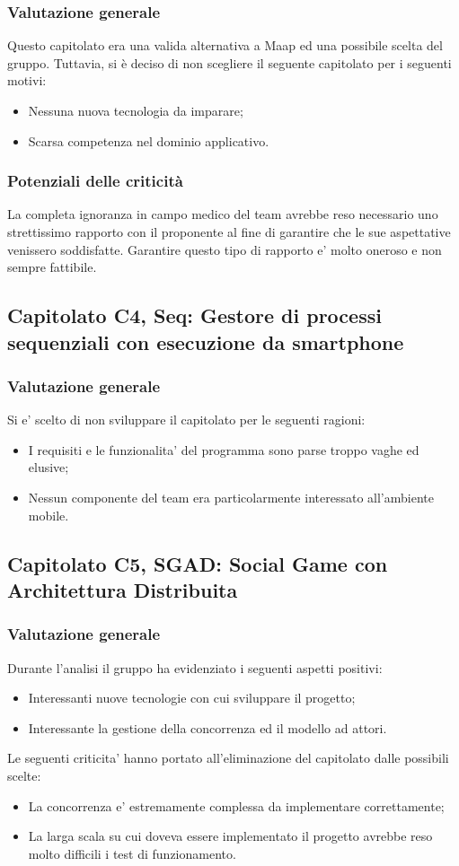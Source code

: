\subsubsection{Valutazione generale} 
Questo capitolato era una valida alternativa a Maap ed una possibile scelta del gruppo. Tuttavia, si è deciso di non scegliere il seguente capitolato per i seguenti motivi:
\begin{itemize}
\item Nessuna nuova tecnologia da imparare;
\item Scarsa competenza nel dominio applicativo.
\end{itemize}
\subsubsection{Potenziali delle criticità} 
La completa ignoranza in campo medico del team avrebbe reso necessario uno strettissimo rapporto con il proponente al fine di garantire che le sue aspettative venissero soddisfatte. Garantire questo tipo di rapporto e’ molto oneroso e non sempre fattibile.
\subsection{Capitolato C4,  Seq: Gestore di processi sequenziali con esecuzione da smartphone} 
\label{3.3}
\subsubsection{Valutazione generale} 
Si e’ scelto di non sviluppare il capitolato per le seguenti ragioni:
\begin{itemize}
\item I requisiti e le funzionalita’ del programma sono parse troppo vaghe ed elusive;
\item Nessun componente del team era particolarmente interessato all’ambiente mobile.
\end{itemize}
\subsection{Capitolato C5,  SGAD: Social Game con Architettura Distribuita} 
\label{3.5}
\subsubsection{Valutazione generale} 
Durante l’analisi il gruppo ha evidenziato i seguenti aspetti positivi:
\begin{itemize}
\item Interessanti nuove tecnologie con cui sviluppare il progetto;
\item Interessante la gestione della concorrenza ed il modello ad attori.
\end{itemize}
Le seguenti criticita’ hanno portato all’eliminazione del capitolato dalle possibili scelte:
\begin{itemize}
\item La concorrenza e’ estremamente complessa da implementare correttamente;
\item La larga scala su cui doveva essere implementato il progetto avrebbe reso molto difficili i test di funzionamento.
\end{itemize}
